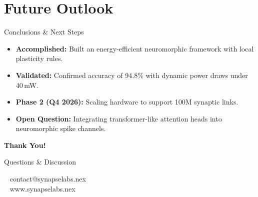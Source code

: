 \section{Future Outlook}

\begin{frame}{Conclusions \& Next Steps}
  \begin{itemize}
    \item[\faCheck] \textbf{Accomplished:} Built an energy-efficient neuromorphic framework with local plasticity rules.
    \item[\faCheck] \textbf{Validated:} Confirmed accuracy of 94.8\% with dynamic power draws under 40\,mW.
    \item[\faCalendar] \textbf{Phase 2 (Q4 2026):} Scaling hardware to support 100M synaptic links.
    \item[\faLightbulb] \textbf{Open Question:} Integrating transformer-like attention heads into neuromorphic spike channels.
  \end{itemize}
\end{frame}

\begin{frame}[plain]
  \begin{center}
    \Huge\color{SynapseBlue}\textbf{Thank You!}
    
    \vspace{0.6cm}
    \large\color{SynapseDark}Questions \& Discussion
    
    \vspace{1cm}
    \small
    \faEnvelope~ contact@synapselabs.nex \\
    \faGlobe~ www.synapselabs.nex
  \end{center}
\end{frame}
